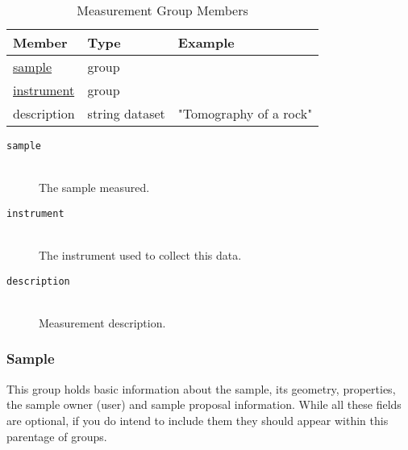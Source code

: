 \begin{table}[h!]\sffamily
\centering
\footnotesize
\caption{Measurement Group Members}
\begin{tabular}{l l l}
\toprule
\bfseries Member     & \bfseries Type & \bfseries Example \\
\midrule
\hyperref[table:sample]{sample} & group &  \\
\hyperref[table:instrument]{instrument} & group & \\
description & string dataset &  "Tomography of a rock" \\   
\bottomrule
\end{tabular}
\end{table}

\begin{description}
\item[\tt{sample}] \hfill \\
{The sample measured.}

\item[\tt {instrument}] \hfill \\
{The instrument used to collect this data.}

\item[\tt {description}] \hfill \\
{Measurement description.}

\end{description}

\subsubsection{Sample}
\label{table:sample}

This group holds basic information about the sample, its geometry, properties,
the sample owner (user) and sample proposal information. While all these fields
are optional, if you do intend to include them they should appear within this parentage of
groups.

